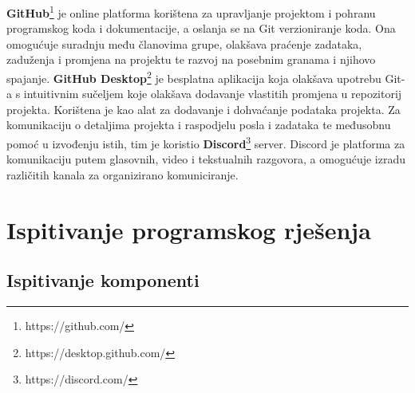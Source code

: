 			\newline\newline
			\noindent\textbf{GitHub}\footnote[21]{https://github.com/} je online platforma korištena za upravljanje projektom i pohranu programskog koda i dokumentacije, a oslanja se na Git verzioniranje koda. Ona omogućuje suradnju među članovima grupe, olakšava praćenje zadataka, zaduženja i promjena na projektu te razvoj na posebnim granama i njihovo spajanje. \textbf{GitHub Desktop}\footnote[22]{https://desktop.github.com/} je besplatna aplikacija koja olakšava upotrebu Git-a s intuitivnim sučeljem koje olakšava dodavanje vlastitih promjena u repozitorij projekta. Korištena je kao alat za dodavanje i dohvaćanje podataka projekta. Za komunikaciju o detaljima projekta i raspodjelu posla i zadataka te međusobnu pomoć u izvođenju istih, tim je koristio \textbf{Discord}\footnote[23]{https://discord.com/} server. Discord je platforma za komunikaciju putem glasovnih, video i tekstualnih razgovora, a omogućuje izradu različitih kanala za organizirano komuniciranje.
			
			\eject 
		
	
		\section{Ispitivanje programskog rješenja}
			
			
	
			
			\subsection{Ispitivanje komponenti}
			
